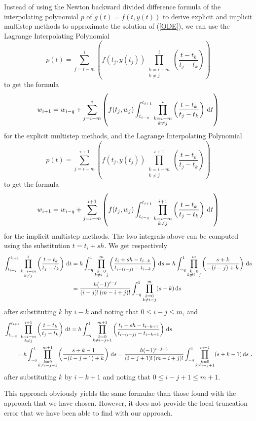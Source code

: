 \begin{rmk}
Instead of using the Newton backward divided difference formula
of the interpolating polynomial $p$ of $g(t) = f(t,y(t))$ to derive
explicit and implicit multistep methods to approximate the solution of
(\ref{ODE}), we can use the Lagrange Interpolating Polynomial
\[
p(t) = \sum_{j=i-m}^i\left( f(t_j,y(t_j)) \prod_{\substack{k=i-m\\k\neq j}}^i
\left(\frac{t-t_k}{t_j-t_k}\right) \right)
\]
to get the formula
\[
w_{i+1} = w_{i-q} + \sum_{j=i-m}^i \left( f(t_j,w_j)
\int_{t_{i-q}}^{t_{i+1}} \prod_{\substack{k=i-m\\k\neq j}}^i
\left(\frac{t-t_k}{t_j-t_k}\right) \,\mathrm{d}t \right)
\]
for the explicit multistep methods, and the Lagrange Interpolating
Polynomial
\[
p(t) = \sum_{j=i-m}^{i+1}\left( f(t_j,y(t_j))
\prod_{\substack{k=i-m\\k\neq j}}^{i+1} \left(\frac{t-t_k}{t_j-t_k}\right) \right)
\]
to get the formula
\[
w_{i+1} = w_{i-q} +
\sum_{j=i-m}^{i+1} \left( f(t_j,w_j)
\int_{t_{i-q}}^{t_{i+1}} \prod_{\substack{k=i-m\\k\neq j}}^{i+1}
\left(\frac{t-t_k}{t_j-t_k}\right) \,\mathrm{d}t \right)
\]
for the implicit multistep methods.  The two integrals above can be
computed using the substitution $t = t_i + sh$.  We get respectively
\begin{align*}
\int_{t_{i-q}}^{t_{i+1}} \prod_{\substack{k=i-m\\k\neq j}}^i
\left(\frac{t-t_k}{t_j-t_k}\right) \,\mathrm{d}t
&= h\int_{-q}^1 \prod_{\substack{k=0\\k\neq i-j}}^m
\left(\frac{t_i+sh -t_{i-k}}{t_{i-(i-j)}-t_{i-k}}\right) \,\mathrm{d}s
= h \int_{-q}^1 \prod_{\substack{k=0\\k\neq i-j}}^m
\left(\frac{s+k}{-(i-j)+k}\right) \,\mathrm{d}s \\
& = \frac{h (-1)^{i-j}}{(i-j)!\,(m-i+j)!}
\int_{-q}^1 \prod_{\substack{k=0\\k\neq i-j}}^m (s+k) \,\mathrm{d}s
\end{align*}
after substituting $k$ by $i-k$ and noting that $0 \leq i-j\leq m$,
and
\begin{align*}
&\int_{t_{i-q}}^{t_{i+1}} \prod_{\substack{k=i-m\\k\neq j}}^{i+1}
\left(\frac{t-t_k}{t_j-t_k}\right) \,\mathrm{d}t
= h\int_{-q}^1 \prod_{\substack{k=0\\k\neq i-j+1}}^{m+1}
\left(\frac{t_i+sh -t_{i-k+1}}{t_{i-(i-j)}-t_{i-k+1}}\right) \,\mathrm{d}s \\
&\qquad = h \int_{-q}^1 \prod_{\substack{k=0\\k\neq i-j+1}}^{m+1}
\left(\frac{s+k-1}{-(i-j+1)+k}\right) \,\mathrm{d}s
= \frac{h (-1)^{i-j+1}}{(i-j+1)!\,(m-i+j)!}
\int_{-q}^1 \prod_{\substack{k=0\\k\neq i-j+1}}^{m+1} (s+k-1) \,\mathrm{d}s \ .
\end{align*}
after substituting $k$ by $i-k+1$ and noting that
$0 \leq i-j+1\leq m+1$.

This approach obviously yields the same formulae than those found with
the approach that we have chosen.  However, it does not provide the
local truncation error that we have been able to find with our
approach.
\end{rmk}

